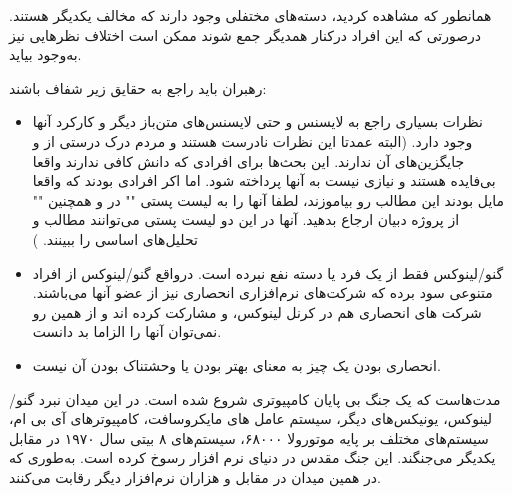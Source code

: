 همانطور که مشاهده کردید، دسته‌های مختفلی وجود دارند که مخالف یکدیگر هستند.
درصورتی که این افراد درکنار همدیگر جمع شوند ممکن است اختلاف نظرهایی نیز به‌وجود بیاید.

رهبران باید راجع به حقایق زیر شفاف باشند:

\begin{itemize}
\item 
نظرات بسیاری راجع به لایسنس  و حتی لایسنس‌های متن‌باز دیگر و کارکرد آنها وجود دارد.
(البته عمدتا این نظرات نادرست هستند و مردم درک درستی از  و جایگزین‌های آن ندارند.
این بحث‌ها برای افرادی که دانش کافی ندارند واقعا بی‌فایده هستند و نیازی نیست به آنها پرداخته شود.
اما اکر افرادی بودند که واقعا مایل بودند این مطالب رو بیاموزند، لطفا آنها را به لیست پستی "" 
در  و همچنین "" از پروژه دبیان ارجاع بدهید. آنها در این دو لیست پستی
می‌توانند مطالب و تحلیل‌های اساسی را ببینند.
)

\item 
گنو/لینوکس فقط از یک فرد یا دسته نفع نبرده است. درواقع گنو/لینوکس از افراد متنوعی
سود برده که شرکت‌های نرم‌افزاری انحصاری نیز از عضو آنها می‌باشند. شرکت های انحصاری
هم در کرنل لینوکس،  و  مشارکت کرده اند و از همین رو نمی‌توان آنها
را الزاما بد دانست.

\item 
انحصاری بودن یک چیز به معنای بهتر بودن یا وحشتناک بودن آن نیست.
\end{itemize}

مدت‌هاست که یک جنگ بی پایان کامپیوتری شروع شده است. در این میدان نبرد
گنو/لینوکس، یونیکس‌های دیگر، سیستم عامل های مایکروسافت، کامپیوترهای آی بی ام،
سیستم‌های مختلف بر پایه موتورولا ۶۸۰۰۰، سیستم‌های ۸ بیتی سال ۱۹۷۰ در مقابل یکدیگر
می‌جنگند. این جنگ مقدس در دنیای نرم افزار رسوخ کرده است. به‌طوری که در
همین میدان  در مقابل  و هزاران نرم‌افزار دیگر رقابت می‌کنند.

